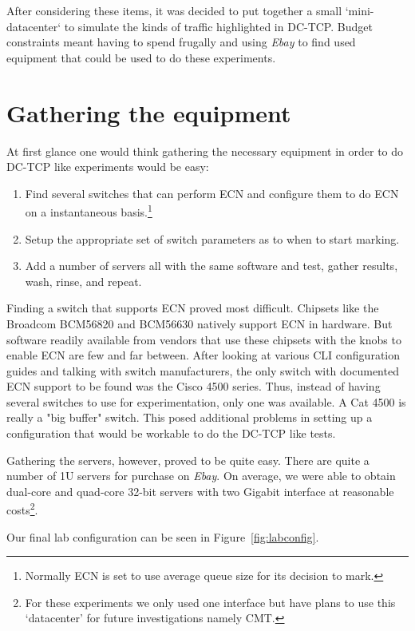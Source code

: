 \documentclass[12pt]{article}
\begin{document}
After considering these items, it was decided to put together a small `mini-datacenter` to simulate the
kinds of traffic highlighted in DC-TCP. Budget constraints meant having to spend frugally and 
using \emph{Ebay} to find used equipment that could be used to do these experiments.

\section{Gathering the equipment}

At first glance one would think gathering the necessary equipment in order to do DC-TCP like
experiments would be easy:
\begin{enumerate}
\item Find several switches that can perform ECN and configure them
to do ECN on a instantaneous basis.\footnote{Normally ECN is set to use average queue size
for its decision to mark.}

\item Setup the appropriate set of switch parameters as to when to start
marking. 

\item Add a number of servers all with the same software and test, gather results, wash, rinse, and repeat.
\end{enumerate}

Finding a switch that supports ECN proved most difficult.  
Chipsets like the Broadcom BCM56820 and BCM56630 natively support 
ECN in hardware. But software readily available from vendors that use these chipsets with
the knobs to enable ECN are few and far between. After looking at various CLI
configuration guides and talking with switch manufacturers, the only switch with documented
ECN support to be found was the Cisco 4500 series. Thus, instead of having several switches
to use for experimentation, only one was available. A Cat 4500 is really a "big buffer"
switch. This posed additional problems in setting up a configuration that would be workable
to do the DC-TCP like tests.

Gathering the servers, however, proved to be quite easy. There are quite a number of 1U servers
for purchase on \emph{Ebay}. On average, we were able to obtain dual-core and quad-core 32-bit 
servers with two Gigabit interface at reasonable costs\footnote{For these experiments we only used
one interface but have plans to use this `datacenter' for future investigations  namely CMT.}. 

Our final lab configuration can be seen in Figure~\ref{fig:labconfig}.
\end{document}
